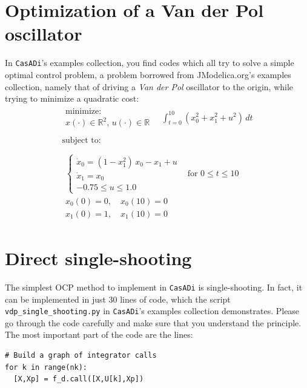 \documentclass[a4paper,12pt]{book}
\newcommand{\CasADi}{\texttt{CasADi}\xspace}
\begin{document}
\section{Optimization of a Van der Pol oscillator}
In \CasADi's examples collection, you find codes which all try to solve a simple optimal control problem, a problem borrowed from JModelica.org's examples collection, namely that of driving a \emph{Van der Pol} oscillator to the origin, while trying to minimize a quadratic cost:
\begin{equation}
\begin{array}{lc}
\begin{array}{l}
\text{minimize:} \\
x(\cdot) \in \mathbb{R}^2, \, u(\cdot) \in \mathbb{R}
\end{array}
\quad \displaystyle \int_{t=0}^{10}{(x_0^2 + x_1^2 + u^2) \, dt}
\\
\\
\text{subject to:} \\
\\
\begin{array}{ll}
\left\{
\begin{array}{l}
\dot{x}_0 = (1-x_1^2) \, x_0 - x_1 + u \\
\dot{x}_1 = x_0 \\
-0.75 \le u \le 1.0
\end{array} \right. & \text{for $0 \le t \le 10$} \\
x_0(0)=0, \quad x_0(10)=0  \\
x_1(0)=1, \quad x_1(10)=0  
\end{array}
\end{array}
\label{eq:vdp}
\end{equation}

\section{Direct single-shooting}
The simplest OCP method to implement in \CasADi is single-shooting. In fact, it can be implemented in just 30 lines of code, which the script {\texttt{vdp\_single\_shooting.py}} in \CasADi's examples collection demonstrates. Please go through the code carefully and make sure that you understand the principle. The most important part of the code are the lines:
\begin{verbatim}
# Build a graph of integrator calls
for k in range(nk):
  [X,Xp] = f_d.call([X,U[k],Xp])
\end{verbatim}
\end{document}
